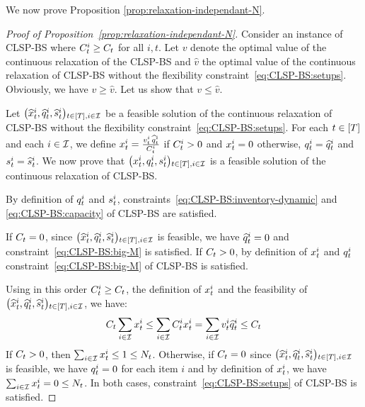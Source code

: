 
We now prove Proposition \cref{prop:relaxation-independant-N}.

\begin{proof}[Proof of Proposition~\cref{prop:relaxation-independant-N}]
Consider an instance of CLSP-BS where $C_t^i\ge C_t$ for all $i,t$.
Let $v$ denote the optimal value of the continuous relaxation of the CLSP-BS and $\widehat{v}$ the optimal value of the continuous relaxation of CLSP-BS without the flexibility constraint~\eqref{eq:CLSP-BS:setups}. Obviously, we have $v \ge \widehat{v}$. Let us show that $v \le \widehat{v}$.

Let $\bracket{\widehat{\setup}_t^i, \widehat{\quantity}_t^i, \widehat{\inventory}_t^i}_{t\in\range{\horizon},i\in\REF}$ be a feasible solution of the continuous relaxation of CLSP-BS without the flexibility constraint~\eqref{eq:CLSP-BS:setups}.
For each $t\in\range{\horizon}$ and each $i\in\mathcal{I}$, we define
$x_t^i=\frac{v_t^i\,\widehat{q}_t^i}{C_t^i}$ if $C_t^i>0$ and $x_t^i=0$ otherwise, $q_t^i=\widehat{q}_t^i$ and $s_t^i=\widehat{s}_t^i$. We now prove that $\bracket{\setup_t^i, \quantity_t^i, \inventory_t^i}_{t\in\range{\horizon},i\in\REF}$ is a feasible solution of the continuous relaxation of CLSP-BS.

By definition of $q_t^i$ and $s_t^i$, constraints~\eqref{eq:CLSP-BS:inventory-dynamic} and \eqref{eq:CLSP-BS:capacity} of CLSP-BS are satisfied.

If $C_t=0$, since $\bracket{\widehat{\setup}_t^i, \widehat{\quantity}_t^i, \widehat{\inventory}_t^i}_{t\in\range{\horizon},i\in\REF}$ is feasible, we have $\widehat{q}_t^i=0$ and constraint~\eqref{eq:CLSP-BS:big-M} is satisfied. If $C_t>0$, by definition of $x_t^i$ and $q_t^i$ constraint~\eqref{eq:CLSP-BS:big-M} of CLSP-BS is satisfied.

Using in this order $C_t^i\ge C_t$, the definition of $x_t^i$ and the feasibility of $\bracket{\widehat{\setup}_t^i, \widehat{\quantity}_t^i, \widehat{\inventory}_t^i}_{t\in\range{\horizon},i\in\REF}$, we have:
\begin{equation}
C_t\sum_{i\in\mathcal{I}}x_t^i
\le
\sum_{i\in\mathcal{I}}C_t^ix_t^i
=
\sum_{i\in\mathcal{I}}v_t^i\widehat{q}_t^i
\le
C_t
\end{equation}
If $C_t>0$, then $\sum_{i\in\mathcal{I}}x_t^i\le 1\le N_t$. Otherwise, if $C_t=0$ since $\bracket{\widehat{\setup}_t^i, \widehat{\quantity}_t^i, \widehat{\inventory}_t^i}_{t\in\range{\horizon},i\in\REF}$ is feasible, we have $q_t^i=0$ for each item $i$ and by definition of $x_t^i$, we have $\sum_{i\in\mathcal{I}}x_t^i=0\le N_t$. In both cases, constraint~\eqref{eq:CLSP-BS:setups} of CLSP-BS is satisfied.


\end{proof}
